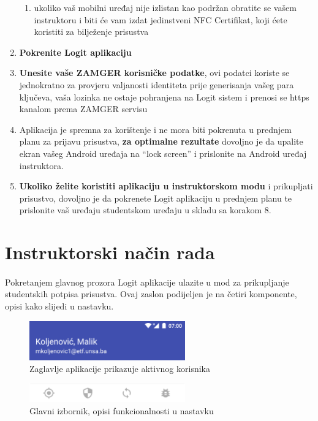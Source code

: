\begin{enumerate}
    \begin{enumerate}
        \item ukoliko vaš mobilni uređaj nije izlistan kao podržan obratite se vašem instruktoru i biti će vam izdat jedinstveni NFC Certifikat, koji ćete koristiti za bilježenje prisustva
    \end{enumerate}
    \item \textbf{Pokrenite Logit aplikaciju}
    \item \textbf{Unesite vaše ZAMGER korisničke podatke}, ovi podatci koriste se jednokratno za provjeru valjanosti identiteta prije generisanja vašeg para ključeva, vaša lozinka ne ostaje pohranjena na Logit sistem i prenosi se https kanalom prema ZAMGER servisu
    \item Aplikacija je spremna za korištenje i ne mora biti pokrenuta u prednjem planu za prijavu prisustva, \textbf{za optimalne rezultate} dovoljno je da upalite ekran vašeg Android uređaja na “lock screen” i prislonite na Android uređaj instruktora.
    \item \textbf{Ukoliko želite koristiti aplikaciju u instruktorskom modu} i prikupljati prisustvo, dovoljno je da pokrenete Logit aplikaciju u prednjem planu te prislonite vaš uređaju studentskom uređaju u skladu sa korakom 8.
\end{enumerate}

\section{Instruktorski način rada}
\paragraph*{}
Pokretanjem glavnog prozora Logit aplikacije ulazite u mod za prikupljanje studentskih potpisa prisustva. Ovaj zaslon podijeljen je na četiri komponente, opisi kako slijedi u nastavku.

\begin{figure}[H]
    \centering
    \includegraphics[width=0.6\textwidth]{material/manual/01-head}
    \caption{Zaglavlje aplikacije prikazuje aktivnog korisnika}
\end{figure}

\begin{figure}[H]
    \centering
    \includegraphics[width=0.6\textwidth]{material/manual/02-menu}
    \caption{Glavni izbornik, opisi funkcionalnosti u nastavku}
\end{figure}

